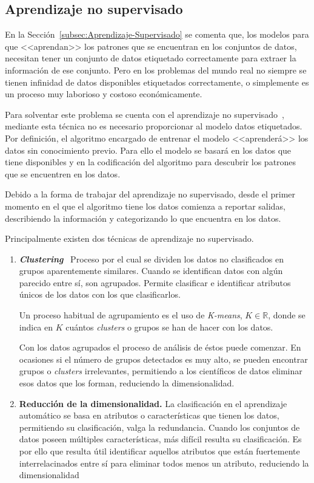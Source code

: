 \subsection{Aprendizaje no supervisado}\label{subsec:Aprendizaje-No-Supervisado}
En la Sección~\ref{subsec:Aprendizaje-Supervisado} se comenta que, los modelos para que <<aprendan>> los patrones que se encuentran en los conjuntos de datos, necesitan tener un conjunto de datos etiquetado correctamente para extraer la información de ese conjunto. Pero en los problemas del mundo real no siempre se tienen infinidad de datos disponibles etiquetados correctamente, o simplemente es un proceso muy laborioso y costoso económicamente.

Para solventar este problema se cuenta con el aprendizaje no supervisado~\cite{bengio2012unsupervised}, mediante esta técnica no es necesario proporcionar al modelo datos etiquetados. Por definición, el algoritmo encargado de entrenar el modelo  <<aprenderá>> los datos sin conocimiento previo. Para ello el modelo se basará en los datos que tiene disponibles y en la codificación del algoritmo para descubrir los patrones que se encuentren en los datos.

Debido a la forma de trabajar del aprendizaje no supervisado, desde el primer momento en el que el algoritmo tiene los datos comienza a reportar salidas, describiendo la información y categorizando lo que encuentra en los datos.

Principalmente existen dos técnicas de aprendizaje no supervisado.
\begin{enumerate}
	\item \textbf{\textit{Clustering}}~\cite{unsupervised_learning_clustering} Proceso por el cual se dividen los datos no clasificados en grupos aparentemente similares. Cuando se identifican datos con algún parecido entre sí, son agrupados. Permite clasificar e identificar atributos únicos de los datos con los que clasificarlos. 
	
	Un proceso habitual de agrupamiento es el uso de \textit{K-means}, $K\in\mathbb{R}$, donde se indica en $K$ cuántos \textit{clusters} o grupos se han de hacer con los datos. 
	
	Con los datos agrupados el proceso de análisis de éstos puede comenzar. En ocasiones si el número de grupos detectados es muy alto, se pueden encontrar grupos o \textit{clusters} irrelevantes, permitiendo a los científicos de datos eliminar esos datos que los forman, reduciendo la dimensionalidad. 
	
	\item \textbf{Reducción de la dimensionalidad.} La clasificación en el aprendizaje automático se basa en atributos o características que tienen los datos, permitiendo su clasificación, valga la redundancia. Cuando los conjuntos de datos poseen múltiples características, más difícil resulta su clasificación. Es por ello que resulta útil identificar aquellos atributos que están fuertemente interrelacinados entre sí para eliminar todos menos un atributo, reduciendo la dimensionalidad~\cite{li2002unsupervised}
\end{enumerate}

